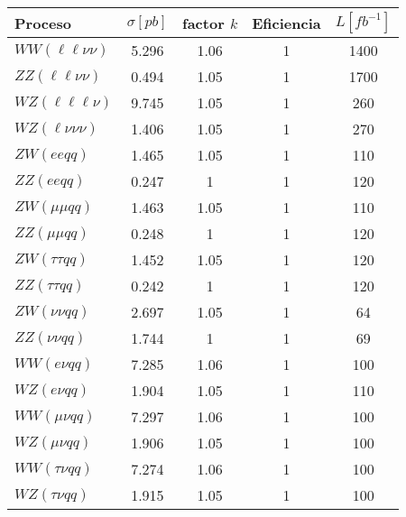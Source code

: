 \begin{table}[ht!]
  \begin{tabular}{lcccc}
    \hline
    Proceso & $\sigma [pb]$ & factor $k$ & Eficiencia & $L [fb^{-1}]$ \\
    \hline
    $WW (\ell\ell\nu\nu)$        & 5.296  & 1.06 & 1 & 1400 \\
    $ZZ (\ell\ell\nu\nu)$        & 0.494  & 1.05 & 1 & 1700 \\
    $WZ (\ell\ell\ell\nu)$       & 9.745  & 1.05 & 1 & 260 \\
    $WZ (\ell\nu\nu\nu)$         & 1.406  & 1.05 & 1 & 270 \\
    $ZW (eeqq)$                  & 1.465  & 1.05 & 1 & 110 \\
    $ZZ (eeqq)$                  & 0.247  & 1    & 1 & 120 \\
    $ZW (\mu\mu qq)$             & 1.463  & 1.05 & 1 & 110 \\
    $ZZ (\mu\mu qq)$             & 0.248  & 1    & 1 & 120 \\
    $ZW (\tau\tau qq)$           & 1.452  & 1.05 & 1 & 120 \\
    $ZZ (\tau\tau qq)$           & 0.242  & 1    & 1 & 120 \\
    $ZW (\nu\nu qq)$             & 2.697  & 1.05 & 1 & 64 \\
    $ZZ (\nu\nu qq)$             & 1.744  & 1    & 1 & 69 \\
    $WW (e\nu qq)$               & 7.285  & 1.06 & 1 & 100 \\
    $WZ (e\nu qq)$               & 1.904  & 1.05 & 1 & 110 \\
    $WW (\mu\nu qq)$             & 7.297  & 1.06 & 1 & 100 \\
    $WZ (\mu\nu qq)$             & 1.906  & 1.05 & 1 & 100 \\
    $WW (\tau\nu qq)$            & 7.274  & 1.06 & 1 & 100 \\
    $WZ (\tau\nu qq)$            & 1.915  & 1.05 & 1 & 100 \\
    \hline
  \end{tabular}
  \label{tab:bkg_diboson_samples}
 \end{table}




